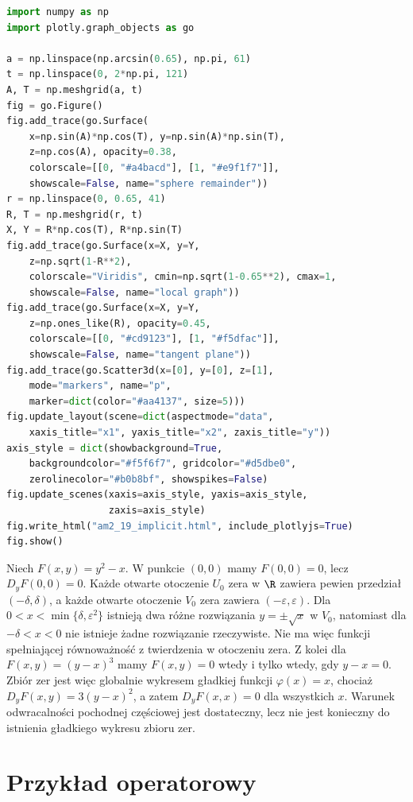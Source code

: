 \begin{lstlisting}[language=Python]
import numpy as np
import plotly.graph_objects as go

a = np.linspace(np.arcsin(0.65), np.pi, 61)
t = np.linspace(0, 2*np.pi, 121)
A, T = np.meshgrid(a, t)
fig = go.Figure()
fig.add_trace(go.Surface(
    x=np.sin(A)*np.cos(T), y=np.sin(A)*np.sin(T),
    z=np.cos(A), opacity=0.38,
    colorscale=[[0, "#a4bacd"], [1, "#e9f1f7"]],
    showscale=False, name="sphere remainder"))
r = np.linspace(0, 0.65, 41)
R, T = np.meshgrid(r, t)
X, Y = R*np.cos(T), R*np.sin(T)
fig.add_trace(go.Surface(x=X, y=Y,
    z=np.sqrt(1-R**2),
    colorscale="Viridis", cmin=np.sqrt(1-0.65**2), cmax=1,
    showscale=False, name="local graph"))
fig.add_trace(go.Surface(x=X, y=Y,
    z=np.ones_like(R), opacity=0.45,
    colorscale=[[0, "#cd9123"], [1, "#f5dfac"]],
    showscale=False, name="tangent plane"))
fig.add_trace(go.Scatter3d(x=[0], y=[0], z=[1],
    mode="markers", name="p",
    marker=dict(color="#aa4137", size=5)))
fig.update_layout(scene=dict(aspectmode="data",
    xaxis_title="x1", yaxis_title="x2", zaxis_title="y"))
axis_style = dict(showbackground=True,
    backgroundcolor="#f5f6f7", gridcolor="#d5dbe0",
    zerolinecolor="#b0b8bf", showspikes=False)
fig.update_scenes(xaxis=axis_style, yaxis=axis_style,
                  zaxis=axis_style)
fig.write_html("am2_19_implicit.html", include_plotlyjs=True)
fig.show()
\end{lstlisting}

\begin{przyklad}
\label{ma2:ex:implicit-degenerate}
Niech $F(x,y)=y^2-x$. W punkcie $(0,0)$ mamy
$F(0,0)=0$, lecz $D_yF(0,0)=0$. Każde otwarte
otoczenie $U_0$ zera w $\R$ zawiera pewien przedział
$(-\delta,\delta)$, a każde otwarte otoczenie $V_0$
zera zawiera $(-\varepsilon,\varepsilon)$.
Dla $0<x<\min\{\delta,\varepsilon^2\}$ istnieją dwa
różne rozwiązania $y=\pm\sqrt{x}$ w $V_0$,
natomiast dla $-\delta<x<0$ nie istnieje żadne
rozwiązanie rzeczywiste. Nie ma więc funkcji
spełniającej równoważność z twierdzenia w otoczeniu zera.
Z kolei dla $F(x,y)=(y-x)^3$ mamy
$F(x,y)=0$ wtedy i tylko wtedy, gdy $y-x=0$.
Zbiór zer jest więc globalnie wykresem gładkiej
funkcji $\varphi(x)=x$, chociaż
$D_yF(x,y)=3(y-x)^2$, a zatem $D_yF(x,x)=0$
dla wszystkich $x$.
Warunek odwracalności pochodnej częściowej jest
dostateczny, lecz nie jest konieczny do istnienia
gładkiego wykresu zbioru zer.
\end{przyklad}

\section{Przykład operatorowy}


